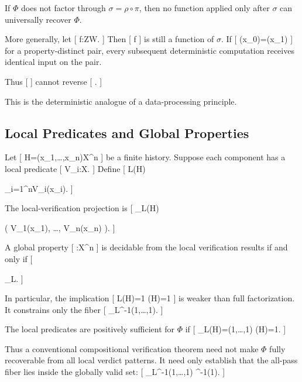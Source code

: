 \documentclass[11pt]{article}
\begin{document}
\begin{corollary}
If $\Phi$ does not factor through $\sigma=\rho\circ\pi$, then no function applied only after $\sigma$ can universally recover $\Phi$.
\end{corollary}

More generally, let
[
f:\mathcal Z\to\mathcal W.
]
Then
[
f\circ\sigma
]
is still a function of $\sigma$. If
[
\sigma(x_0)=\sigma(x_1)
]
for a property-distinct pair, every subsequent deterministic computation receives identical input on the pair.

Thus
[
]
cannot reverse
[
.
]

This is the deterministic analogue of a data-processing principle.

\subsection{Local Predicates and Global Properties}

Let
[
H=(x_1,\ldots,x_n)\in\mathcal X^n
]
be a finite history. Suppose each component has a local predicate
[
V_i:\mathcal X.
]
Define
[
L(H)

\bigwedge_{i=1}^{n}V_i(x_i).
]

The local-verification projection is
[
\pi_L(H)

\bigl(
V_1(x_1),
\ldots,
V_n(x_n)
\bigr).
]

A global property
[
\Phi:\mathcal X^n
]
is decidable from the local verification results if and only if
[
\Phi

\widehat{\Phi}\circ\pi_L.
]

In particular, the implication
[
L(H)=1
\Longrightarrow
\Phi(H)=1
]
is weaker than full factorization. It constrains only the fiber
[
\pi_L^{-1}(1,\ldots,1).
]

\begin{definition}
The local predicates are positively sufficient for $\Phi$ if
[
\pi_L(H)=(1,\ldots,1)
\Longrightarrow
\Phi(H)=1.
]
\end{definition}

Thus a conventional compositional verification theorem need not make $\Phi$ fully recoverable from all local verdict patterns. It need only establish that the all-pass fiber lies inside the globally valid set:
[
\pi_L^{-1}(1,\ldots,1)
\subseteq
\Phi^{-1}(1).
]
\end{document}
